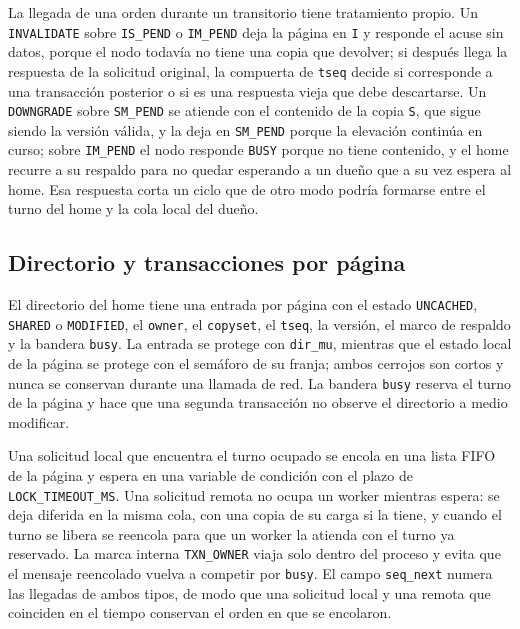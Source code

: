 La llegada de una orden durante un transitorio tiene tratamiento propio. Un \texttt{INVALIDATE} sobre \texttt{IS\_PEND} o \texttt{IM\_PEND} deja la página en \texttt{I} y responde el acuse sin datos, porque el nodo todavía no tiene una copia que devolver; si después llega la respuesta de la solicitud original, la compuerta de \texttt{tseq} decide si corresponde a una transacción posterior o si es una respuesta vieja que debe descartarse. Un \texttt{DOWNGRADE} sobre \texttt{SM\_PEND} se atiende con el contenido de la copia \texttt{S}, que sigue siendo la versión válida, y la deja en \texttt{SM\_PEND} porque la elevación continúa en curso; sobre \texttt{IM\_PEND} el nodo responde \texttt{BUSY} porque no tiene contenido, y el home recurre a su respaldo para no quedar esperando a un dueño que a su vez espera al home. Esa respuesta corta un ciclo que de otro modo podría formarse entre el turno del home y la cola local del dueño.

\subsection{Directorio y transacciones por página}\label{sec:msi-directorio}

El directorio del home tiene una entrada por página con el estado \texttt{UNCACHED}, \texttt{SHARED} o \texttt{MODIFIED}, el \texttt{owner}, el \texttt{copyset}, el \texttt{tseq}, la versión, el marco de respaldo y la bandera \texttt{busy}. La entrada se protege con \texttt{dir\_mu}, mientras que el estado local de la página se protege con el semáforo de su franja; ambos cerrojos son cortos y nunca se conservan durante una llamada de red. La bandera \texttt{busy} reserva el turno de la página y hace que una segunda transacción no observe el directorio a medio modificar.

Una solicitud local que encuentra el turno ocupado se encola en una lista FIFO de la página y espera en una variable de condición con el plazo de \texttt{LOCK\_TIMEOUT\_MS}. Una solicitud remota no ocupa un worker mientras espera: se deja diferida en la misma cola, con una copia de su carga si la tiene, y cuando el turno se libera se reencola para que un worker la atienda con el turno ya reservado. La marca interna \texttt{TXN\_OWNER} viaja solo dentro del proceso y evita que el mensaje reencolado vuelva a competir por \texttt{busy}. El campo \texttt{seq\_next} numera las llegadas de ambos tipos, de modo que una solicitud local y una remota que coinciden en el tiempo conservan el orden en que se encolaron.

